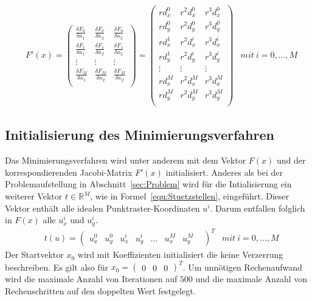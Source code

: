 \begin{equation}
\label{equ:Jacobi}
\begin{aligned}
&F'(x)=
\begin{pmatrix}
\frac{\delta F_0}{\delta \kappa_1} & \frac{\delta F_0}{\delta \kappa_2} & \frac{\delta F_0}{\delta \kappa_2}\\
\frac{\delta F_1}{\delta \kappa_1} & \frac{\delta F_1}{\delta \kappa_2} & \frac{\delta F_1}{\delta \kappa_2}\\
 \vdots & \vdots & \vdots \\
\frac{\delta F_M}{\delta \kappa_1} & \frac{\delta F_M}{\delta \kappa_2} & \frac{\delta F_M}{\delta \kappa_2}\\
\end{pmatrix}= \begin{pmatrix}
rd_x^0 & r^2d_x^0 & r^3d_x^0\\
rd_y^0 & r^2d_y^0 & r^3d_y^0\\
rd_x^1 & r^2d_x^i & r^3d_x^i\\
rd_y^1 & r^2d_y^i & r^3d_y^i\\
\vdots & \vdots & \vdots \\
rd_x^M & r^2d_x^M & r^3d_x^M\\
rd_y^M & r^2d_y^M & r^3d_y^M\\
\end{pmatrix}
&mit\ i = 0,\dots,M
\end{aligned}
\end{equation}

\subsection{Initialisierung des Minimierungsverfahren}
\label{sec:Minimierung}
Das Minimierungsverfahren wird unter anderem mit dem Vektor $F(x)$ und der korrespondierenden Jacobi-Matrix $F'(x)$ initialisiert. Anderes als bei der Problemaufstellung in Abschnitt~\ref{sec:Problem} wird für die Intialisierung ein weiterer Vektor $t \in \mathbb{R}^M$, wie in Formel~\ref{equ:Stuetzstellen}, eingeführt. Dieser Vektor enthält alle idealen Punktraster-Koordinaten $u^i$. Darum entfallen folglich in $F(x)$ alle $u_x^i$ und $u_y^i$.
\begin{equation}
\label{equ:Stuetzstellen}
\begin{aligned}
&t(u)=
\begin{pmatrix}
u_x^0&
u_y^0&
u_x^i&
u_y^i&
\dots&
u_x^M&
u_y^M&
\end{pmatrix}^T
&mit\ i = 0,\dots,M
\end{aligned}
\end{equation}
Der Startvektor $x_0$ wird mit Koeffizienten initialisiert die keine Verzerrung beschreiben. Es gilt also für $x_0 = \begin{pmatrix}
0 & 0 & 0
\end{pmatrix}^T$. Um unnötigen Rechenaufwand wird die maximale Anzahl von Iterationen auf $500$ und die maximale Anzahl von Rechenschritten auf den doppelten Wert festgelegt.

